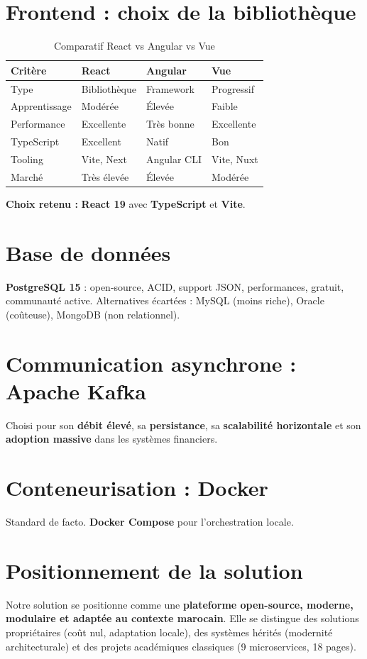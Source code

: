 \documentclass[12pt,a4paper,oneside]{report}
\begin{document}
\section{Frontend : choix de la bibliothèque}

\begin{table}[H]
\centering
\caption{Comparatif React vs Angular vs Vue}
\begin{tabular}{llll}
\toprule
\textbf{Critère} & \textbf{React} & \textbf{Angular} & \textbf{Vue} \\
\midrule
Type & Bibliothèque & Framework & Progressif \\
Apprentissage & Modérée & Élevée & Faible \\
Performance & Excellente & Très bonne & Excellente \\
TypeScript & Excellent & Natif & Bon \\
Tooling & Vite, Next & Angular CLI & Vite, Nuxt \\
Marché & Très élevée & Élevée & Modérée \\
\bottomrule
\end{tabular}
\end{table}

\textbf{Choix retenu :} \textbf{React 19} avec \textbf{TypeScript} et \textbf{Vite}.

\section{Base de données}
\textbf{PostgreSQL 15} : open-source, ACID, support JSON, performances, gratuit, communauté active. Alternatives écartées : MySQL (moins riche), Oracle (coûteuse), MongoDB (non relationnel).

\section{Communication asynchrone : Apache Kafka}
Choisi pour son \textbf{débit élevé}, sa \textbf{persistance}, sa \textbf{scalabilité horizontale} et son \textbf{adoption massive} dans les systèmes financiers.

\section{Conteneurisation : Docker}
Standard de facto. \textbf{Docker Compose} pour l'orchestration locale.

\section{Positionnement de la solution}
Notre solution se positionne comme une \textbf{plateforme open-source, moderne, modulaire et adaptée au contexte marocain}. Elle se distingue des solutions propriétaires (coût nul, adaptation locale), des systèmes hérités (modernité architecturale) et des projets académiques classiques (9 microservices, 18 pages).
\end{document}
